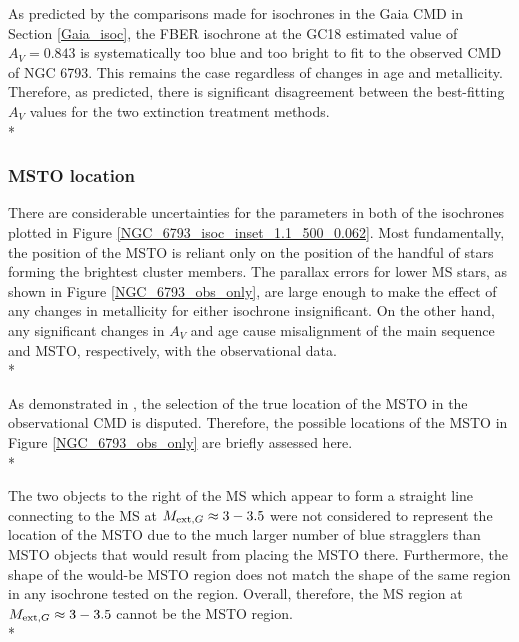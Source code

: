 \documentclass[12pt, a4paper]{report}
\begin{document}
As predicted by the comparisons made for isochrones in the Gaia CMD in Section \ref{Gaia_isoc}, the FBER isochrone at the GC18 estimated value of $A_{V} = 0.843$ is systematically too blue and too bright to fit to the observed CMD of NGC 6793. This remains the case regardless of changes in age and metallicity. Therefore, as predicted, there is significant disagreement between the best-fitting $A_{V}$ values for the two extinction treatment methods.\\*

\subsubsection{MSTO location}
There are considerable uncertainties for the parameters in both of the isochrones plotted in Figure \ref{NGC_6793_isoc_inset_1.1_500_0.062}. Most fundamentally, the position of the MSTO is reliant only on the position of the handful of stars forming the brightest cluster members. The parallax errors for lower MS stars, as shown in Figure \ref{NGC_6793_obs_only}, are large enough to make the effect of any changes in metallicity for either isochrone insignificant. On the other hand, any significant changes in $A_{V}$ and age cause misalignment of the main sequence and MSTO, respectively, with the observational data.\\*

As demonstrated in \cite{2019A&A...623A.108B}, the selection of the true location of the MSTO in the observational CMD is disputed. Therefore, the possible locations of the MSTO in Figure \ref{NGC_6793_obs_only} are briefly assessed here.\\*

The two objects to the right of the MS which appear to form a straight line connecting to the MS at $M_{\textnormal{ext},G} \approx 3-3.5$ were not considered to represent the location of the MSTO due to the much larger number of blue stragglers than MSTO objects that would result from placing the MSTO there. Furthermore, the shape of the would-be MSTO region does not match the shape of the same region in any isochrone tested on the region. Overall, therefore, the MS region at $M_{\textnormal{ext},G} \approx 3-3.5$ cannot be the MSTO region.\\*
\end{document}
